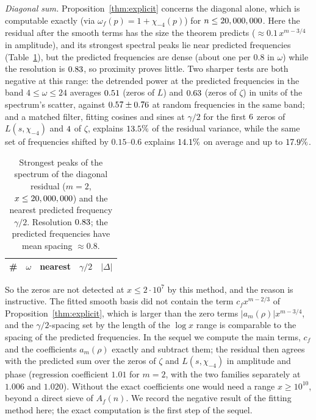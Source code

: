 \documentclass[11pt,a4paper]{article}
\theoremstyle{remark}\newtheorem{remark}[theorem]{Remark}
\begin{document}
\emph{Diagonal sum.} Proposition~\ref{thm:explicit} concerns the diagonal alone, which is computable
exactly (via $\omega_f(p)=1+\chi_{-4}(p)$) for $n\le20,000,000$. Here the residual after the smooth terms has
the size the theorem predicts ($\approx0.1\,x^{m-3/4}$ in amplitude), and its strongest spectral peaks
lie near predicted frequencies (Table~\ref{tab:rieszd}), but the predicted frequencies are dense
(about one per $0.8$ in $\omega$) while the resolution is $0.83$, so proximity proves little. Two
sharper tests are both negative at this range: the detrended power at the predicted frequencies in the
band $4\le\omega\le24$ averages $0.51$ (zeros of $L$) and $0.63$ (zeros of $\zeta$) in units of the
spectrum's scatter, against $0.57\pm0.76$ at random frequencies in the same band; and a matched
filter, fitting cosines and sines at $\gamma/2$ for the first $6$ zeros of $L(s,\chi_{-4})$ and
$4$ of $\zeta$, explains $13.5\%$ of the residual variance, while the same set of frequencies
shifted by $0.15$--$0.6$ explains $14.1\%$ on average and up to $17.9\%$.

\begin{table}[htbp]
\centering\small
\caption{Strongest peaks of the spectrum of the diagonal residual ($m=2$, $x\le20,000,000$) and the nearest
predicted frequency $\gamma/2$. Resolution $0.83$; the predicted frequencies have mean spacing $\approx0.8$.}
\label{tab:rieszd}
\begin{tabular}{rrlrr}
\toprule
\# & $\omega$ & nearest & $\gamma/2$ & $|\Delta|$\\
\midrule

\end{tabular}
\end{table}

So the zeros are not detected at $x\le2\cdot10^7$ by this method, and the reason is instructive. The
fitted smooth basis did not contain the term $c_fx^{m-2/3}$ of Proposition~\ref{thm:explicit}, which is
larger than the zero terms $|a_m(\rho)|x^{m-3/4}$, and the $\gamma/2$-spacing set by the length of the
$\log x$ range is comparable to the spacing of the predicted frequencies. In the sequel we compute the
main terms, $c_f$ and the coefficients $a_m(\rho)$ exactly and subtract them; the residual then agrees
with the predicted sum over the zeros of $\zeta$ and $L(s,\chi_{-4})$ in amplitude and phase (regression
coefficient $1.01$ for $m=2$, with the two families separately at $1.006$ and $1.020$). Without the exact coefficients one would need a range
$x\ge10^{10}$, beyond a direct sieve of $A_f(n)$. We record the negative result of the fitting method
here; the exact computation is the first step of the sequel.
\end{document}
